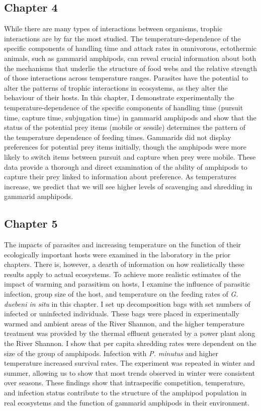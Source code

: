 \subsection{Chapter 4}
While there are many types of interactions between organisms, trophic interactions are by far the most studied. The temperature-dependence of the specific components of handling time and attack rates in omnivorous, ectothermic animals, such as gammarid amphipods, can reveal crucial information about both the mechanisms that underlie the structure of food webs and the relative strength of those interactions across temperature ranges. Parasites have the potential to alter the patterns of trophic interactions in ecosystems, as they alter the behaviour of their hosts. In this chapter, I demonstrate experimentally the temperature-dependence of the specific components of handling time (pursuit time, capture time, subjugation time) in gammarid amphipods and show that the status of the potential prey items (mobile or sessile) determines the pattern of the temperature dependence of feeding times.  Gammarids did not display preferences for potential prey items initially, though the amphipods were more likely to switch items between pursuit and capture when prey were mobile.  These data provide a thorough and direct examination of the ability of amphipods to capture their prey linked to information about preference. As temperatures increase, we predict that we will see higher levels of scavenging and shredding in gammarid amphipods. 

\subsection{Chapter 5}
The impacts of parasites and increasing temperature on the function of their ecologically important hosts were examined in the laboratory in the prior chapters. There is, however, a dearth of information on how realistically these results apply to actual ecosystems. To achieve more realistic estimates of the impact of warming and parasitism on hosts, I examine the influence of parasitic infection, group size of the host, and temperature on the feeding rates of \emph{G. duebeni in situ} in this chapter. I set up decomposition bags with set numbers of infected or uninfected individuals. These bags were placed in experimentally warmed and ambient areas of the River Shannon, and the higher temperature treatment was provided by the thermal effluent generated by a power plant along the River Shannon. I show that per capita shredding rates were dependent on the size of the group of amphipods. Infection with \emph{P. minutus} and higher temperature increased survival rates. The experiment was repeated in winter and summer, allowing us to show that most trends observed in winter were consistent over seasons. These findings show that intraspecific competition, temperature, and infection status contribute to the structure of the amphipod population in real ecosystems and the function of gammarid amphipods in their environment. 

